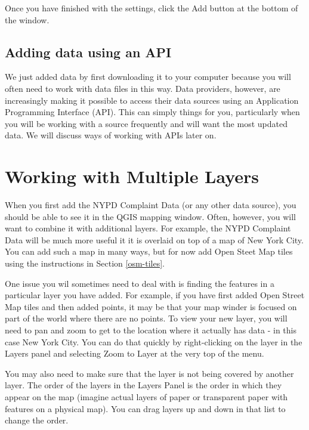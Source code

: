 \documentclass[]{book}
\begin{document}
Once you have finished with the settings, click the Add button at the bottom of the window.

\hypertarget{adding-data-using-an-api}{%
\subsection{Adding data using an API}\label{adding-data-using-an-api}}

We just added data by first downloading it to your computer because you will often need to work with data files in this way. Data providers, however, are increasingly making it possible to access their data sources using an Application Programming Interface (API). This can simply things for you, particularly when you will be working with a source frequently and will want the most updated data. We will discuss ways of working with APIs later on.

\hypertarget{working-with-multiple-layers}{%
\section{Working with Multiple Layers}\label{working-with-multiple-layers}}

When you first add the NYPD Complaint Data (or any other data source), you should be able to see it in the QGIS mapping window. Often, however, you will want to combine it with additional layers. For example, the NYPD Complaint Data will be much more useful it it is overlaid on top of a map of New York City. You can add such a map in many ways, but for now add Open Steet Map tiles using the instructions in Section \ref{osm-tiles}.

One issue you wil sometimes need to deal with is finding the features in a particular layer you have added. For example, if you have first added Open Street Map tiles and then added points, it may be that your map winder is focused on part of the world where there are no points. To view your new layer, you will need to pan and zoom to get to the location where it actually has data - in this case New York City. You can do that quickly by right-clicking on the layer in the Layers panel and selecting Zoom to Layer at the very top of the menu.

You may also need to make sure that the layer is not being covered by another layer. The order of the layers in the Layers Panel is the order in which they appear on the map (imagine actual layers of paper or transparent paper with features on a physical map). You can drag layers up and down in that list to change the order.
\end{document}
